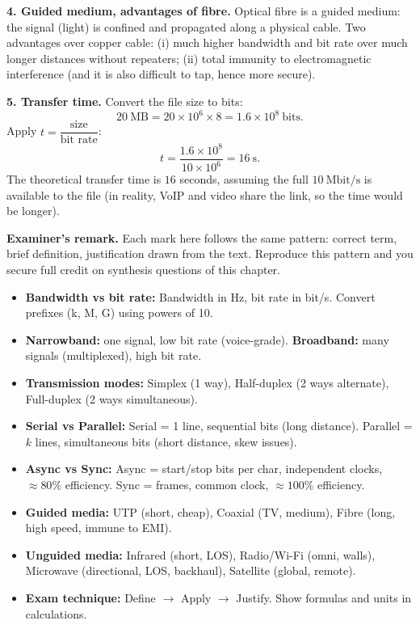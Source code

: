 \documentclass[11pt]{article}
\newcommand{\cle}[1]{{\popxbold\color{popdark}#1}}
\begin{document}
\begin{exoresolu}
\textbf{4. Guided medium, advantages of fibre.} Optical fibre is a \cle{guided} medium: the signal (light) is confined and propagated along a physical cable. Two advantages over copper cable: (i) much higher bandwidth and bit rate over much longer distances without repeaters; (ii) total immunity to electromagnetic interference (and it is also difficult to tap, hence more secure).

\textbf{5. Transfer time.} Convert the file size to bits:
\[ 20\ \mathrm{MB} = 20 \times 10^6 \times 8 = 1.6 \times 10^8\ \mathrm{bits}. \]
Apply $t = \dfrac{\text{size}}{\text{bit rate}}$:
\[ t = \dfrac{1.6 \times 10^8}{10 \times 10^6} = 16\ \mathrm{s}. \]
The theoretical transfer time is $16$ seconds, assuming the full $10\ \mathrm{Mbit/s}$ is available to the file (in reality, VoIP and video share the link, so the time would be longer).

\textbf{Examiner's remark.} Each mark here follows the same pattern: correct term, brief definition, justification drawn from the text. Reproduce this pattern and you secure full credit on synthesis questions of this chapter.
\end{exoresolu}

\begin{aretenir}
\begin{itemize}
\item \textbf{Bandwidth vs bit rate:} Bandwidth in Hz, bit rate in bit/s. Convert prefixes (k, M, G) using powers of 10.
\item \textbf{Narrowband:} one signal, low bit rate (voice-grade). \textbf{Broadband:} many signals (multiplexed), high bit rate.
\item \textbf{Transmission modes:} Simplex (1 way), Half-duplex (2 ways alternate), Full-duplex (2 ways simultaneous).
\item \textbf{Serial vs Parallel:} Serial = 1 line, sequential bits (long distance). Parallel = $k$ lines, simultaneous bits (short distance, skew issues).
\item \textbf{Async vs Sync:} Async = start/stop bits per char, independent clocks, $\approx 80\%$ efficiency. Sync = frames, common clock, $\approx 100\%$ efficiency.
\item \textbf{Guided media:} UTP (short, cheap), Coaxial (TV, medium), Fibre (long, high speed, immune to EMI).
\item \textbf{Unguided media:} Infrared (short, LOS), Radio/Wi-Fi (omni, walls), Microwave (directional, LOS, backhaul), Satellite (global, remote).
\item \textbf{Exam technique:} Define $\rightarrow$ Apply $\rightarrow$ Justify. Show formulas and units in calculations.
\end{itemize}
\end{aretenir}
\end{document}
